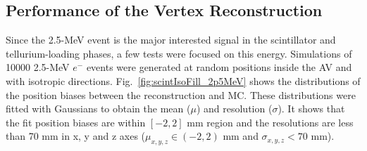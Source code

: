 \subsection{Performance of the Vertex Reconstruction}
Since the 2.5-MeV event is the major interested signal in the scintillator and tellurium-loading phases, a few tests were focused on this energy. Simulations of 10000 2.5-MeV $e^-$ events were generated at random positions inside the AV and with isotropic directions. Fig.~\ref{fig:scintIsoFill_2p5MeV} shows the distributions of the position biases between the reconstruction and MC. These distributions were fitted with Gaussians to obtain the mean ($\mu$) and resolution ($\sigma$). It shows that the fit position biases are within $[-2,2]$ mm region and the resolutions are less than 70 mm in x, y and z axes ($\mu_{x,y,z}\in(-2,2)$ mm and $\sigma_{x,y,z}<70$ mm).

